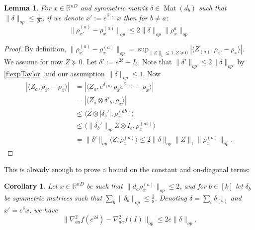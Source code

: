 \documentclass[aos]{imsart}
\newtheorem{corollary}[theorem]{Corollary}
\newtheorem{lemma}[theorem]{Lemma}
\theoremstyle{definition}
\numberwithin{equation}{section}
\DeclareMathOperator{\Mat}{Mat}
\newcommand{\R}{{\mathbb{R}}}
\newcommand{\samp}{x}
\newcommand{\CF}[1]{{\color{purple}[CF: #1]}}
\newcommand{\AR}[1]{{\color{orange}[AR: #1]}}
\begin{document}
\begin{appendix}
\begin{lemma} \label{btoaaRobustness}
For $\samp \in \R^{nD}$ and symmetric matrix $\delta \in \Mat(d_{b})$ such that $\|\delta\|_{op} \leq \frac{1}{20}$, if we denote $\samp' := e^{\delta_{(b)}} \samp$ then for $b \neq a$:
\[ \|\rho_{\samp'}^{(a)} - \rho_{\samp}^{(a)}\|_{op} \leq 2 \|\delta\|_{op} \|\rho_{\samp}^{a}\|_{op}      \]
\end{lemma}
\begin{proof}
By definition, $\|\rho_{\samp'}^{(a)} - \rho_{\samp}^{(a)}\|_{op} = \sup_{\|Z\|_{1} \leq 1, Z \succeq 0} |\langle Z_{(a)}, \rho_{\samp'} - \rho_{\samp} \rangle|$. We assume for now $Z \succeq 0$. Let $\delta' := e^{2\delta} - I_b$. Note that $\|\delta'\|_{op} \leq 2 \|\delta\|_{op}$ by \cref{f:expTaylor} and our assumption $\|\delta\|_{op} \leq 1$. Now
\begin{align*} |\langle Z_{a}, \rho_{\samp'} - \rho_{\samp} \rangle| & =
| \langle Z_{a}, e^{\delta_{(b)}}\rho_{\samp} e^{\delta_{(b)}} - \rho_{\samp} \rangle|\\
& = | \langle Z_{a} \otimes \delta'_{b}, \rho_{\samp} \rangle   |  \\
&\leq \langle Z \otimes |\delta_b'|, \rho_{\samp}^{(ab)} \rangle\\
&\leq \langle \|\delta_b'\|_{op} Z \otimes  I_b , \rho_{\samp}^{(ab)} \rangle\\
&= \|\delta'\|_{op} \langle Z, \rho_{\samp}^{(a)} \rangle \leq 2\|\delta\|_{op} \|Z\|_1 \|\rho_{\samp}^{(a)}\|_{op}.
\end{align*}

\end{proof}




This is already enough to prove a bound on the constant and on-diagonal terms:

\begin{corollary} \label{diagRobustness}
Let $\samp \in \R^{nD}$ be such that $\|d_{a} \rho_{\samp}^{(a)}\|_{op} \leq 2$, and for $b \in [k]$ let $\delta_b$ be symmetric matrices such that $\sum_{b} \|\delta_{b}\|_{op} \leq \frac{1}{8}$. Denoting $\delta = \sum_b \delta_{(b)}$ and $x' = e^{\delta} \samp$, we have 
\[ \|\nabla^{2}_{aa} f(e^{2\delta}) - \nabla^{2}_{aa} f(I)\|_{op} \leq 2 e \|\delta\|_{op} .  \]


\end{corollary}
\end{appendix}
\end{document}
